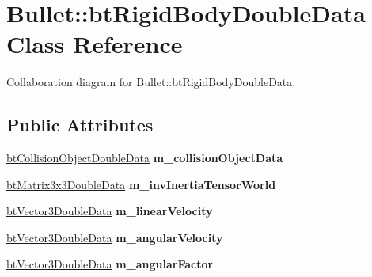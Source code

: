 \hypertarget{class_bullet_1_1bt_rigid_body_double_data}{\section{Bullet\+:\+:bt\+Rigid\+Body\+Double\+Data Class Reference}
\label{class_bullet_1_1bt_rigid_body_double_data}
}


Collaboration diagram for Bullet\+:\+:bt\+Rigid\+Body\+Double\+Data\+:
\subsection*{Public Attributes}
\begin{DoxyCompactItemize}
\item 
\hypertarget{class_bullet_1_1bt_rigid_body_double_data_a7fba2693d1f016432056d255fc591346}{\hyperlink{class_bullet_1_1bt_collision_object_double_data}{bt\+Collision\+Object\+Double\+Data} {\bfseries m\+\_\+collision\+Object\+Data}}\label{class_bullet_1_1bt_rigid_body_double_data_a7fba2693d1f016432056d255fc591346}

\item 
\hypertarget{class_bullet_1_1bt_rigid_body_double_data_a3459a33097be513be1bac9da57e38940}{\hyperlink{class_bullet_1_1bt_matrix3x3_double_data}{bt\+Matrix3x3\+Double\+Data} {\bfseries m\+\_\+inv\+Inertia\+Tensor\+World}}\label{class_bullet_1_1bt_rigid_body_double_data_a3459a33097be513be1bac9da57e38940}

\item 
\hypertarget{class_bullet_1_1bt_rigid_body_double_data_a28992a06c91177d1badc7c14c3326951}{\hyperlink{class_bullet_1_1bt_vector3_double_data}{bt\+Vector3\+Double\+Data} {\bfseries m\+\_\+linear\+Velocity}}\label{class_bullet_1_1bt_rigid_body_double_data_a28992a06c91177d1badc7c14c3326951}

\item 
\hypertarget{class_bullet_1_1bt_rigid_body_double_data_a047f19e6d3cdfe49c4ba7993be734053}{\hyperlink{class_bullet_1_1bt_vector3_double_data}{bt\+Vector3\+Double\+Data} {\bfseries m\+\_\+angular\+Velocity}}\label{class_bullet_1_1bt_rigid_body_double_data_a047f19e6d3cdfe49c4ba7993be734053}

\item 
\hypertarget{class_bullet_1_1bt_rigid_body_double_data_a3d45560e80d3194dfca52fec5b3ae7ef}{\hyperlink{class_bullet_1_1bt_vector3_double_data}{bt\+Vector3\+Double\+Data} {\bfseries m\+\_\+angular\+Factor}}\label{class_bullet_1_1bt_rigid_body_double_data_a3d45560e80d3194dfca52fec5b3ae7ef}


\end{DoxyCompactItemize}
